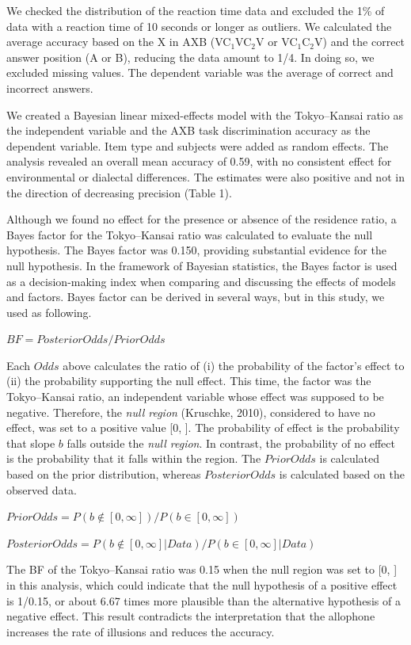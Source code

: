 \documentclass[a4paper,11pt,twocolumn]{article}
\begin{document}
We checked the distribution of the reaction time data and excluded the 1\% of data with a reaction time of 10 seconds or longer as outliers. We calculated the average accuracy based on the X in AXB (VC$_\text{1}$VC$_\text{2}$V or VC$_\text{1}$C$_\text{2}$V) and the correct answer position (A or B), reducing the data amount to 1/4. In doing so, we excluded missing values. The dependent variable was the average of correct and incorrect answers.

We created a Bayesian linear mixed-effects model \cite{lme4, rstanarm, easystats} with the Tokyo--Kansai ratio as the independent variable and the AXB task discrimination accuracy as the dependent variable. Item type and subjects were added as random effects. The analysis revealed an overall mean accuracy of 0.59, with no consistent effect for environmental or dialectal differences. The estimates were also positive and not in the direction of decreasing precision (Table 1).

Although we found no effect for the presence or absence of the residence ratio, a Bayes factor for the Tokyo--Kansai ratio was calculated to evaluate the null hypothesis. The Bayes factor was 0.150, providing substantial evidence for the null hypothesis. In the framework of Bayesian statistics, the Bayes factor is used as a decision-making index when comparing and discussing the effects of models and factors. Bayes factor can be derived in several ways, but in this study, we used as following.

$BF = Posterior Odds / Prior Odds$

Each $Odds$ above calculates the ratio of (i) the probability of the factor's effect to (ii) the probability supporting the null effect. This time, the factor was the Tokyo--Kansai ratio, an independent variable whose effect was supposed to be negative. Therefore, the \textit{null region} (Kruschke, 2010), considered to have no effect, was set to a positive value [0, \infty]. The probability of effect is the probability that slope $b$ falls outside the \textit{null region}. In contrast, the probability of no effect is the probability that it falls within the region. The $Prior Odds$ is calculated based on the prior distribution, whereas $Posterior Odds$ is calculated based on the observed data.

$Prior  Odds = P(b\notin[0, \infty]) / P(b\in[0, \infty])$

$Posterior Odds = P(b\notin[0, \infty] | Data) / P(b\in[0, \infty] | Data)$

The BF of the Tokyo--Kansai ratio was 0.15 when the null region was set to [0, \infty] in this analysis, which could indicate that the null hypothesis of a positive effect is 1/0.15, or about 6.67 times more plausible than the alternative hypothesis of a negative effect. This result contradicts the interpretation that the allophone increases the rate of illusions and reduces the accuracy.
\end{document}
